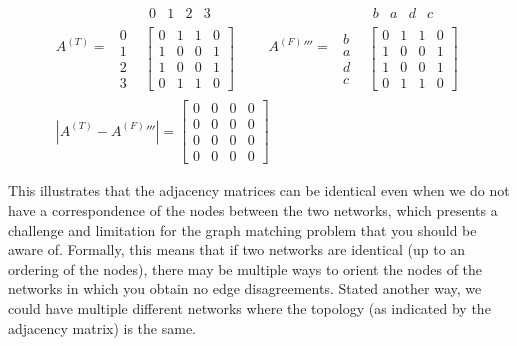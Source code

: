 \begin{floatingbox}[h]
\begin{align*}
A^{(T)} = 
\begin{array}{cc} &
\begin{array}{cccc} 0 & 1 & 2 & 3 \end{array}
\\
\begin{array}{cccc}
0 \\
1 \\
2 \\
3 \end{array}
&
\left[
\begin{array}{cccc}
0 & 1 & 1 & 0\\
1 & 0 & 0 & 1\\
1 & 0 & 0 & 1\\
0 & 1 & 1 & 0\end{array}
\right]\end{array}
\quad \quad
A^{(F)}''' = 
\begin{array}{cc} &
\begin{array}{cccc} b & a & d & c \end{array}
\\
\begin{array}{ccc}
b \\
a \\
d \\
c \end{array}
&
\left[
\begin{array}{cccc}
0 & 1 & 1 & 0\\
1 & 0 & 0 & 1\\
1 & 0 & 0 & 1\\
0 & 1 & 1 & 0\end{array}
\right]\end{array} \\
\left|A^{(T)} - A^{(F)}'''\right| = \left[
\begin{array}{cccc}
0 & 0 & 0 & 0\\
0 & 0 & 0 & 0\\
0 & 0 & 0 & 0\\
0 & 0 & 0 & 0\end{array}
\right]
\end{align*}

This illustrates that the adjacency matrices can be identical even when we do not have a correspondence of the nodes between the two networks, which presents a challenge and limitation for the graph matching problem that you should be aware of. Formally, this means that if two networks are identical (up to an ordering of the nodes), there may be multiple ways to orient the nodes of the networks in which you obtain no edge disagreements. Stated another way, we could have multiple different networks where the topology (as indicated by the adjacency matrix) is the same.
\end{floatingbox}

